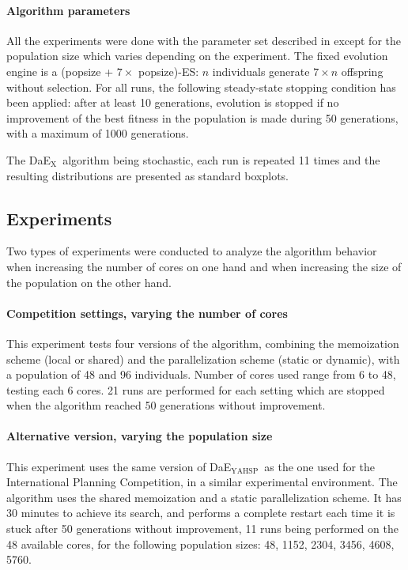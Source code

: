 \documentclass{sig-alternate}
\newcommand{\DAEX}{{\sc DaE$_{\text{X}}$}}
\newcommand{\DAEYAHSP}{{\sc DaE$_{\text{YAHSP}}$}}
\begin{document}
\paragraph{Algorithm parameters}
All the experiments were done with the parameter set described in
\cite{dae:icaps2010} except for the population size which varies depending on the experiment. The fixed evolution engine is a (popsize + $7 \times$ popsize)-ES: $n$ individuals generate $7 \times n$ offspring without selection.
For all runs, the following steady-state stopping condition has been applied:
after at least 10 generations, evolution is stopped if no improvement of the
best fitness in the population is made during 50 generations, with a maximum of
1000 generations.

The \DAEX\ algorithm being stochastic, each run is repeated 11 times and the resulting distributions are presented as standard boxplots.

\subsection{Experiments}

Two types of experiments were conducted to analyze the algorithm behavior when
increasing the number of cores on one hand and when increasing the size of the
population on the other hand.

\paragraph{Competition settings, varying the number of cores}
This experiment tests four versions of the algorithm, combining
the memoization scheme (local or shared) and the parallelization
scheme (static or dynamic), with a population of 48 and 96 individuals.
Number of cores used range from 6 to 48, testing each 6 cores. 21 runs are
performed for each setting which are stopped when
the algorithm reached 50 generations without improvement.

\paragraph{Alternative version, varying the population size}
This experiment uses the same version of \DAEYAHSP\ as the one used for the
International Planning Competition, in a similar experimental environment. The
algorithm uses the shared memoization and a static parallelization scheme. It
has 30 minutes to achieve its search, and performs a complete restart each
time it is stuck after 50 generations without improvement, 11 runs
being performed on the 48 available cores, for the following
population sizes: 48, 1152, 2304, 3456, 4608, 5760. 
\end{document}
